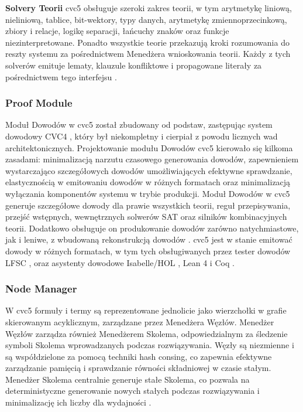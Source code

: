 \textbf{Solvery Teorii} cvc5 obsługuje szeroki zakres teorii, w tym arytmetykę liniową, nieliniową, tablice, bit-wektory, typy danych, arytmetykę zmiennoprzecinkową, zbiory i relacje, logikę separacji, łańcuchy znaków oraz funkcje niezinterpretowane. Ponadto wszystkie teorie przekazują kroki rozumowania do reszty systemu za pośrednictwem Menedżera wnioskowania teorii. Każdy z tych solverów emituje lematy, klauzule konfliktowe i propagowane literały za pośrednictwem tego interfejsu \cite{BarbosaBBKLMMMN22}.

\subsubsection{Proof Module} Moduł Dowodów w cvc5 został zbudowany od podstaw, zastępując system dowodowy CVC4 \cite{HadareanBRTD15}, który był niekompletny i cierpiał z powodu licznych wad architektonicznych. Projektowanie modułu Dowodów cvc5 kierowało się kilkoma zasadami: minimalizacją narzutu czasowego generowania dowodów, zapewnieniem wystarczająco szczegółowych dowodów umożliwiających efektywne sprawdzanie, elastycznością w emitowaniu dowodów w różnych formatach oraz minimalizacją wyłączania komponentów systemu w trybie produkcji. Moduł Dowodów w cvc5 generuje szczegółowe dowody dla prawie wszystkich teorii, reguł przepisywania, przejść wstępnych, wewnętrznych solwerów SAT oraz silników kombinacyjnych teorii. Dodatkowo obsługuje on produkowanie dowodów zarówno natychmiastowe, jak i leniwe, z wbudowaną rekonstrukcją dowodów \cite{ReynoldsWBBLT17}. cvc5 jest w stanie emitować dowody w różnych formatach, w tym tych obsługiwanych przez tester dowodów LFSC \cite{StumpORHT13}, oraz asystenty dowodowe Isabelle/HOL \cite{NipkowPW02}, Lean 4 \cite{Moura021} i Coq \cite{BertotC04}.

\subsubsection{Node Manager} W cvc5 formuły i termy są reprezentowane jednolicie jako wierzchołki w grafie skierowanym acyklicznym, zarządzane przez Menedżera Węzłów. Menedżer Węzłów zarządza również Menedżerem Skolema, odpowiedzialnym za śledzenie symboli Skolema wprowadzanych podczas rozwiązywania. Węzły są niezmienne i są współdzielone za pomocą techniki hash consing, co zapewnia efektywne zarządzanie pamięcią i sprawdzanie równości składniowej w czasie stałym. Menedżer Skolema centralnie generuje stałe Skolema, co pozwala na deterministyczne generowanie nowych stałych podczas rozwiązywania i minimalizację ich liczby dla wydajności \cite{ReynoldsNBT20}. 

